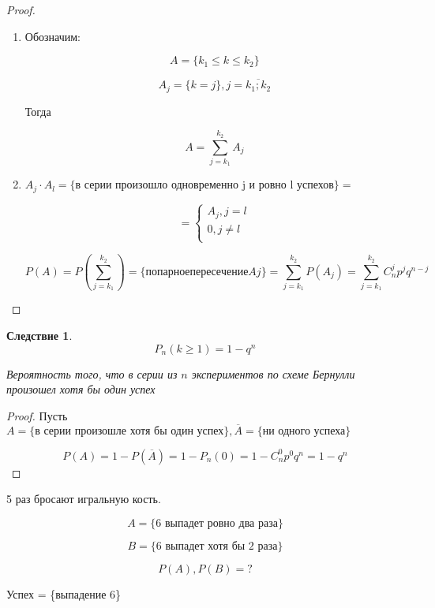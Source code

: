 \documentclass[a4paper, 14pt]{report}
\newtheorem{cont}{Следствие}[chapter]
\begin{document}
\begin{proof}
    \hfill

    \begin{enumerate}
        \item Обозначим:

            $$
            A = \{ k_1 \le k \le k_2 \}
            $$

            $$
            A_j = \{ k = j \}, j = \overline{k_1;k_2}
            $$

            Тогда

            $$
            A = \sum_{j = k_1}^{k_2} A_j
            $$

        \item $A_j \cdot A_l = \{ \text{в серии произошло одновременно j и ровно l успехов} \} =$

            $$
            =
            \begin{cases}
                A_j, j=l \\
                0, j \ne l \\
            \end{cases}
            $$

            $$
            P(A) = P(\sum_{j=k_1}^{k_2}) = \{попарное пересечение Aj\} = \sum_{j=k_1}^{k_2} P(A_j) = \sum_{j=k_1}^{k_2} C_n^j p^j q^{n-j}
            $$
    \end{enumerate}
\end{proof}

\begin{cont}
    $$
    P_n(k \geq 1) = 1 - q^n
    $$

    Вероятность того, что в серии из $n$ экспериментов по схеме Бернулли произошел хотя бы один успех
\end{cont}

\begin{proof}
    Пусть $A = \{ \text{в серии произошле хотя бы один успех} \}, \overline A = \{ \text{ни одного успеха} \}$

    $$
    P(A) = 1 - P(\overline{A}) = 1 - P_n(0) = 1 - C_n^0 p^0 q^n = 1 - q^n
    $$
\end{proof}

5 раз бросают игральную кость.

$$
A = \{ \text{6 выпадет ровно два раза} \}
$$

$$
B = \{ \text{6 выпадет хотя бы 2 раза} \}
$$

$$
P(A),P(B) = ?
$$

Успех = \{выпадение 6\}
\end{document}
